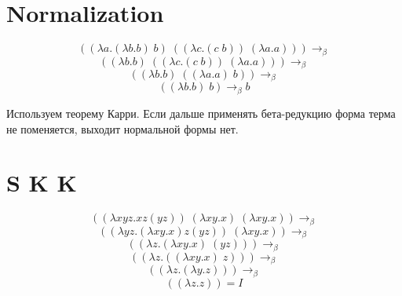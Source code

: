\documentclass[a4paper,12pt]{article}
\begin{document}
\section*{Normalization}
\[
((\lambda a. (\lambda b. b) \; b) \; ((\lambda c. (c \; b)) \; (\lambda a. a))) \to_\beta
\]
\[
((\lambda b. b) \; ((\lambda c. (c \; b)) \; (\lambda a. a))) \to_\beta
\]
\[
((\lambda b. b) \; ((\lambda a. a) \; b)) \to_\beta
\]
\[
((\lambda b. b) \; b) \to_\beta b
\]

\noindent
Используем теорему Карри. Если дальше применять бета-редукцию форма терма не поменяется, выходит нормальной формы нет.

\section*{S K K}
\[
((\lambda x y z. x z (y z)) \; (\lambda x y. x) \; (\lambda x y. x)) \to_\beta
\]
\[
((\lambda y z. (\lambda x y. x) z (y z)) \; (\lambda x y. x)) \to_\beta
\]
\[
((\lambda z. (\lambda x y. x) \; (y z))) \to_\beta
\]
\[
((\lambda z. ((\lambda x y. x) \; z))) \to_\beta
\]
\[
((\lambda z. (\lambda y. z))) \to_\beta
\]
\[
((\lambda z. z)) = I
\]
\end{document}
